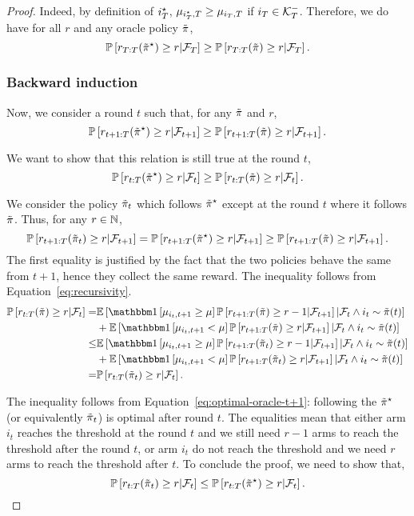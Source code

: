 \begin{proof}
Indeed, by definition of $i^\star_T$, $\mu_{i^\star_T,T} \geq \mu_{i_T,T}$ if $i_T \in \mathcal{K}_T^-$. Therefore, we do have for all $r$ and any oracle policy $\Tilde{\pi}$, 
\[
\mathbb{P}\left[r_{T:T}(\Tilde{\pi}^\star) \geq r| \mathcal{F}_T\right] \geq \mathbb{P}\left[r_{T:T}(\Tilde{\pi}) \geq r| \mathcal{F}_T\right].
\]
\subsubsection{Backward induction}
Now, we consider a round $t$ such that, for any $\Tilde{\pi}$ and $r$,
\begin{equation}
\label{eq:recursivity}
  \mathbb{P}\left[r_{t+1:T}(\Tilde{\pi}^\star) \geq r| \mathcal{F}_{t+1}\right] \geq \mathbb{P}\left[r_{t+1:T}(\Tilde{\pi}) \geq r| \mathcal{F}_{t+1}\right].  
\end{equation}

We want to show that this relation is still true at the round $t$, 
\begin{equation*}
  \mathbb{P}\left[r_{t:T}(\Tilde{\pi}^\star) \geq r| \mathcal{F}_t\right] \geq \mathbb{P}\left[r_{t:T}(\Tilde{\pi}) \geq r| \mathcal{F}_t\right].  
\end{equation*}


We consider the policy $\Tilde{\pi}_{t}$ which follows $\Tilde{\pi}^\star$ except at the round $t$ where it follows $\Tilde{\pi}$. Thus, for any $r \in {\mathbb N}$,
\begin{equation}
\label{eq:optimal-oracle-t+1}
    \mathbb{P}\left[r_{t+1:T}(\Tilde{\pi}_{t}) \geq r| \mathcal{F}_{t+1}\right] = \mathbb{P}\left[r_{t+1:T}(\Tilde{\pi}^\star) \geq r| \mathcal{F}_{t+1}\right] \geq \mathbb{P}\left[r_{t+1:T}(\Tilde{\pi}) \geq r| \mathcal{F}_{t+1}\right].
\end{equation}
The first equality is justified by the fact that the two policies behave the same from $t+1$, hence they collect the same reward. The inequality follows from Equation~\ref{eq:recursivity}. 
\begin{align}
 \PP{r_{t:T}(\Tpi) \geq r| \Ft} = &\EE{ \ind{\mu_{i_t,t+1}\geq \mu}\PP{r_{t+1:T}(\Tpi) \geq r-1| \Ftpone}|\Ft \land i_t \sim \Tpi(t)} \nonumber\\
 &+ \EE{ \ind{\mu_{i_t,t+1}< \mu}\PP{r_{t+1:T}(\Tpi) \geq r| \Ftpone}|\Ft \land i_t \sim \Tpi(t)} \nonumber    \\
 \leq& \EE{ \ind{\mu_{i_t,t+1}\geq \mu}\PP{r_{t+1:T}(\Tpi_{t}) \geq r-1| \Ftpone}|\Ft \land i_t \sim \Tpi(t)} \nonumber\\
 &+ \EE{ \ind{\mu_{i_t,t+1}< \mu}\PP{r_{t+1:T}(\Tpi_{t}) \geq r| \Ftpone}|\Ft \land i_t \sim \Tpi(t) }\nonumber\\
 =  &\PP{r_{t:T}(\Tpi_{t}) \geq r| \Ft}.
 \label{eq:Tpit-Tpi}
\end{align}

The inequality follows from Equation~\ref{eq:optimal-oracle-t+1}: following the $\Tilde{\pi}^\star$ (or equivalently $\Tilde{\pi}_{t}$) is optimal after round $t$. The equalities mean that either arm $i_t$ reaches the threshold at the round $t$ and we still need $r-1$ arms to reach the threshold after the round $t$, or arm $i_t$ do not reach the threshold and we need $r$ arms to reach the threshold after $t$. To conclude the proof, we need to show that,
\[
\mathbb{P}\left[r_{t:T}(\Tilde{\pi}_{t}) \geq r| \mathcal{F}_t\right] \leq \mathbb{P}\left[r_{t:T}(\Tilde{\pi}^\star) \geq r| \mathcal{F}_t\right].\]  


\end{proof}
